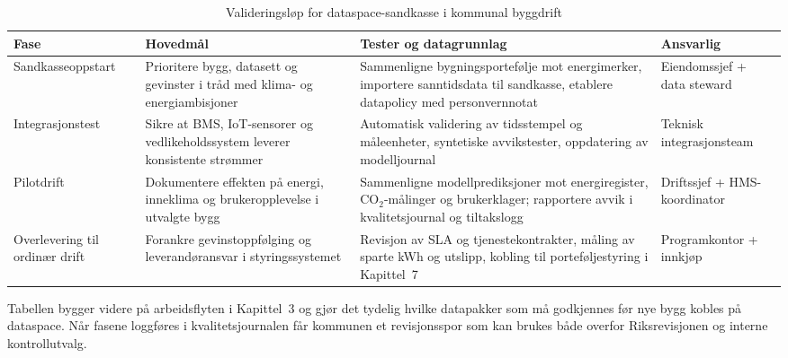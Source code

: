 \begin{table}[ht]
    \centering
    \caption{Valideringsløp for dataspace-sandkasse i kommunal byggdrift}
    \label{tab:byggdrift-validering}
    \begin{tabular}{|p{3.2cm}|p{4.6cm}|p{4.6cm}|p{3.0cm}|}
        \hline
        \textbf{Fase} & \textbf{Hovedmål} & \textbf{Tester og datagrunnlag} & \textbf{Ansvarlig} \\
        \hline
        Sandkasseoppstart & Prioritere bygg, datasett og gevinster i tråd med klima- og energiambisjoner & Sammenligne bygningsportefølje mot energimerker, importere sanntidsdata til sandkasse, etablere datapolicy med personvernnotat \citep{osloeiendom2023strategi,ks2024eiendomsdrift} & Eiendomssjef + data steward \\
        \hline
        Integrasjonstest & Sikre at BMS, IoT-sensorer og vedlikeholdssystem leverer konsistente strømmer & Automatisk validering av tidsstempel og måleenheter, syntetiske avvikstester, oppdatering av modelljournal \citep{bergen2024smartbygg} & Teknisk integrasjonsteam \\
        \hline
        Pilotdrift & Dokumentere effekten på energi, inneklima og brukeropplevelse i utvalgte bygg & Sammenligne modellprediksjoner mot energiregister, CO$_2$-målinger og brukerklager; rapportere avvik i kvalitetsjournal og tiltakslogg \citep{oslo2024klimaeiendom} & Driftssjef + HMS-koordinator \\
        \hline
        Overlevering til ordinær drift & Forankre gevinstoppfølging og leverandøransvar i styringssystemet & Revisjon av SLA og tjenestekontrakter, måling av sparte kWh og utslipp, kobling til porteføljestyring i Kapittel~7 \citep{statsbygg2023digitalmodenhet} & Programkontor + innkjøp \\
        \hline
    \end{tabular}
\end{table}

Tabellen bygger videre på arbeidsflyten i Kapittel~3 og gjør det tydelig hvilke datapakker som må godkjennes før nye bygg kobles på dataspace. Når fasene loggføres i kvalitetsjournalen får kommunen et revisjonsspor som kan brukes både overfor Riksrevisjonen og interne kontrollutvalg.

